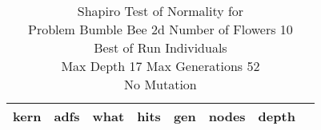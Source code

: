 \begin{table}[H]
\caption{Shapiro Test of Normality for \\ Problem  Bumble Bee 2d  Number of Flowers 10\\Best of Run Individuals \\ Max Depth 17 Max Generations 52\\ No Mutation \\}
\begin{center}
\scalebox{0.8} %
{
\begin{tabular}{lrrrrrrr}
\hline
kern & adfs & what & hits & gen & nodes & depth \\
\hline


\end{tabular}
}
\end{center}
\end{table}

